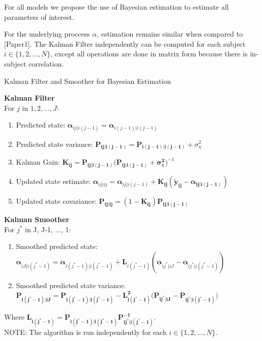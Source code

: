 \documentclass[
]{article}
\begin{document}
For all models we propose the use of Bayesian estimation to estimate all parameters of interest.

For the underlying proccess \(\alpha\), estimation remains similar when compared to {[}Paper1{]}. The Kalman Filter independently can be computed for each subject \(i \in \{1, 2, ..., N\}\), except all operations are done in matrix form because there is in-subject correlation.

\begin{algorithm}
\caption{Kalman Filter and Smoother for Bayesian Estimation}\label{alg:bkfks}
\textbf{Kalman Filter}\\ 
For $j$ in $1, 2, ..., J$:
\begin{enumerate}
  \item {Predicted state:} $\boldsymbol{\alpha}_{ij|i(j-1)} = \boldsymbol{\alpha}_{i(j-1)|i(j-1)}$
  \item {Predicted state variance:} $\boldsymbol{P_{ij|i(j-1)} = P_{i(j-1)|i(j-1)}} + \sigma^2_\eta$
  \item {Kalman Gain:} $\boldsymbol{K_{ij}} = \boldsymbol{\boldsymbol{P}_{ij|i(j-1)}(\boldsymbol{P}_{ij|i(j-1)} + \sigma^2_\varepsilon})^{-1}$
  \item {Updated state estimate:} $\boldsymbol{\alpha}_{ij|ij} = \boldsymbol{\alpha}_{ij|i(j-1)} + \boldsymbol{K_{ij}} (\boldsymbol{\tilde y_{ij}- \alpha_{ij|i(j-1)}})$
  \item {Updated state covariance:} $\boldsymbol{P_{ij|ij}} = (1-\boldsymbol{K_{ij}})\boldsymbol{P_{ij|i(j-1)}}$
\end{enumerate}
\textbf{Kalman Smoother}\\  
For $j^*$ in J, J-1, ..., 1:
\begin{enumerate}
  \item Smoothed predicted state:  $\boldsymbol{\alpha}_{iJ|i(j^*-1)} =\boldsymbol{\alpha}_{i(j^*-1)|i(j^*-1)} + \boldsymbol{L}_{i(j^*-1)} (\boldsymbol{\alpha}_{ij^*|iJ} - \boldsymbol{\alpha}_{ij^*|i(j^*-1)})$
  \item Smoothed predicted state variance:  $\boldsymbol{P_{i(j^*-1)|iJ}} = \boldsymbol{P_{i(j^*-1)|i(j^*-1)}} - \boldsymbol{L_{i(j^*-1)}^2 (P_{ij^*|iJ} -P_{ij^*|i(j^*-1)}})$
\end{enumerate}
Where $\boldsymbol{L_{i(j^*-1)} = P_{{i(j^*-1)}|{i(j^*-1)}}  P^{-1}_{ij^*|i(j^*-1)}}$.\\
NOTE: The algorithm is run independently for each $i \in \{1, 2, ..., N\}$.
\end{algorithm}
\end{document}
